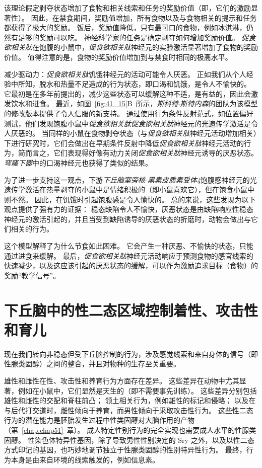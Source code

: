 该理论假定剥夺状态增加了食物和相关线索和任务的奖励价值（即，它们的激励显著性）。
因此，在禁食期间，奖励值增加，所有食物以及与食物相关的提示和任务都获得了极大的奖励。
饭后，奖励值降低，只有最可口的食物，例如冰淇淋，仍然有足够的奖励可以吃。
神经科学家的任务是确定剥夺如何增加奖励价值。
\textit{促食欲相关肽}在饱腹的小鼠中，\textit{促食欲相关肽}神经元的实验激活显著增加了食物的奖励价值。
值得注意的是，食物的奖励价值增加到与禁食时相同的极高水平。


减少驱动力：\textit{促食欲相关肽}饥饿神经元的活动可能令人厌恶。
正如我们从个人经验中所知，脱水和热量不足造成的行为状态，即口渴和饥饿，是令人不愉快的。
它最初是在多年前提出的，减少这些状态可以缓解这种不适，是有益的，因此会激发饮水和进食。
最近，如图~\ref{fig:41_15}B~所示，\textit{斯科特$\cdot$斯特内森}的团队为该模型的修改版本提供了令人信服的新支持。
通过使用行为条件反射范式，如位置偏好测试，他们发现饱腹小鼠中\textit{促食欲相关肽}\textit{促食欲相关肽}神经元的光遗传学激活是令人厌恶的。
当同样的小鼠在食物剥夺状态（与\textit{促食欲相关肽}神经元活动增加相关）下进行研究时，它们会做出在早期条件反射中降低\textit{促食欲相关肽}神经元活动的行为，简而言之，它们表现得好像有动力关闭\textit{促食欲相关肽}神经元诱导的厌恶状态。
\textit{穹窿下器}中的口渴神经元也获得了类似的结果。


为了进一步支持这一观点，下游\textit{下丘脑室旁核}-\textit{黑素皮质素受体4}饱腹感神经元的光遗传学激活在热量剥夺的小鼠中是情绪积极的（即小鼠喜欢它），但在饱食小鼠中则不然。
因此，在饥饿时引起饱腹感是令人愉快的。
总的来说，这些发现为以下观点提供了强有力的证据：
稳态缺陷令人不愉快，厌恶状态是由缺陷响应性稳态神经元的激活引起的，并且当受到缺陷诱导的厌恶状态的折磨时，动物会做出与它们相关的行为。


这个模型解释了为什么节食如此困难。
它会产生一种厌恶、不愉快的状态，只能通过进食来缓解。
最后，\textit{促食欲相关肽}神经元活动响应于预测食物的感官线索的快速减少，以及这应该引起的厌恶状态的缓解，可以作为激励追求目标（食物）的奖励“教学信号”。



\section{下丘脑中的性二态区域控制着性、攻击性和育儿}

现在我们转向非稳态但受下丘脑控制的行为，涉及感觉线索和来自身体的信号（即性腺类固醇）之间的整合，并且对物种的生存至关重要。


雄性和雌性在性、攻击性和养育行为方面存在差异。
这些差异在动物中尤其显著，例如在小鼠中，它们显然是天生的（即不需要事先训练）。
这些差异分别包括雄性和雌性的交配和脊柱前凸；
领土相关行为，例如雄性的标记和侵略；
以及在与后代打交道时，雌性倾向于养育，而男性倾向于采取攻击性行为。
这些性二态行为的潜在能力是胚胎发生过程中性类固醇对大脑作用的产物（第~\ref{chap:chap51}~章）。
成人特定性别行为的完全实现也需要成人水平的性腺类固醇。
性染色体特异性基因，除了导致男性性别决定的 Sry 之外，以及以性二态方式印记的基因，也巧妙地调节独立于性腺类固醇的性别特异性行为。
最终，行为本身是由来自环境的线索触发的，例如信息素。


